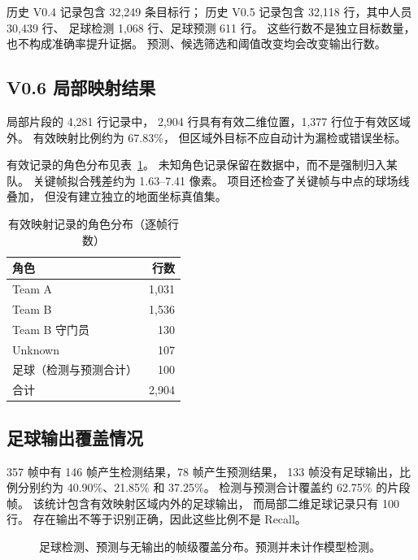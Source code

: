 \documentclass[UTF8,fontset=fandol,11pt,a4paper]{ctexart}
\begin{document}
历史 V0.4 记录包含 32,249 条目标行；
历史 V0.5 记录包含 32,118 行，其中人员 30,439 行、
足球检测 1,068 行、足球预测 611 行。
这些行数不是独立目标数量，也不构成准确率提升证据。
预测、候选筛选和阈值改变均会改变输出行数。

\subsection{V0.6 局部映射结果}
局部片段的 4,281 行记录中，
2,904 行具有有效二维位置，1,377 行位于有效区域外。
有效映射比例约为 67.83\%，
但区域外目标不应自动计为漏检或错误坐标。

有效记录的角色分布见表~\ref{tab:roles}。
未知角色记录保留在数据中，而不是强制归入某队。
关键帧拟合残差约为 1.63--7.41 像素。
项目还检查了关键帧与中点的球场线叠加，
但没有建立独立的地面坐标真值集。

\begin{table}[htbp]
\centering
\caption{有效映射记录的角色分布（逐帧行数）}
\label{tab:roles}
\begin{tabular}{lr}
\toprule
角色 & 行数\\
\midrule
Team A & 1,031\\
Team B & 1,536\\
Team B 守门员 & 130\\
Unknown & 107\\
足球（检测与预测合计） & 100\\
\midrule
合计 & 2,904\\
\bottomrule
\end{tabular}
\end{table}

\subsection{足球输出覆盖情况}
357 帧中有 146 帧产生检测结果，78 帧产生预测结果，
133 帧没有足球输出，比例分别约为 40.90\%、21.85\% 和 37.25\%。
检测与预测合计覆盖约 62.75\% 的片段帧。
该统计包含有效映射区域内外的足球输出，
而局部二维足球记录只有 100 行。
存在输出不等于识别正确，因此这些比例不是 Recall。

\begin{figure}[htbp]
\centering
{}
\caption{足球检测、预测与无输出的帧级覆盖分布。预测并未计作模型检测。}
\end{figure}
\end{document}
